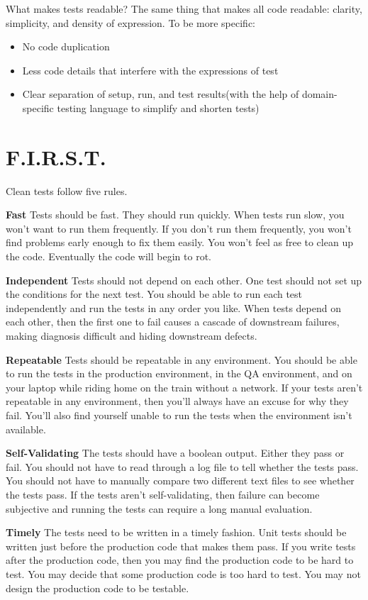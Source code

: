 What makes tests readable? The same thing that makes all code readable: clarity, simplicity, and density of expression. To be more specific:

\begin{itemize}
    \item No code duplication
    \item Less code details that interfere with the expressions of test
    \item Clear separation of setup, run, and test results(with the help of domain-specific testing language to simplify and shorten tests)
\end{itemize}

\section{F.I.R.S.T.}

Clean tests follow five rules.

\textbf{Fast} Tests should be fast. They should run quickly. When tests run slow, you won't want to run them frequently. If you don’t run them frequently, you won’t find problems early enough to fix them easily. You won’t feel as free to clean up the code. Eventually the code will begin to rot.

\textbf{Independent} Tests should not depend on each other. One test should not set up the conditions for the next test. You should be able to run each test independently and run the tests in any order you like. When tests depend on each other, then the first one to fail causes a cascade of downstream failures, making diagnosis difficult and hiding downstream defects.

\textbf{Repeatable} Tests should be repeatable in any environment. You should be able to run the tests in the production environment, in the QA environment, and on your laptop while riding home on the train without a network. If your tests aren’t repeatable in any environment, then you’ll always have an excuse for why they fail. You’ll also find yourself unable to run the tests when the environment isn’t available.

\textbf{Self-Validating} The tests should have a boolean output. Either they pass or fail. You should not have to read through a log file to tell whether the tests pass. You should not have to manually compare two different text files to see whether the tests pass. If the tests aren't self-validating, then failure can become subjective and running the tests can require a long manual evaluation.

\textbf{Timely} The tests need to be written in a timely fashion. Unit tests should be written just before the production code that makes them pass. If you write tests after the production code, then you may find the production code to be hard to test. You may decide that some production code is too hard to test. You may not design the production code to be testable.

